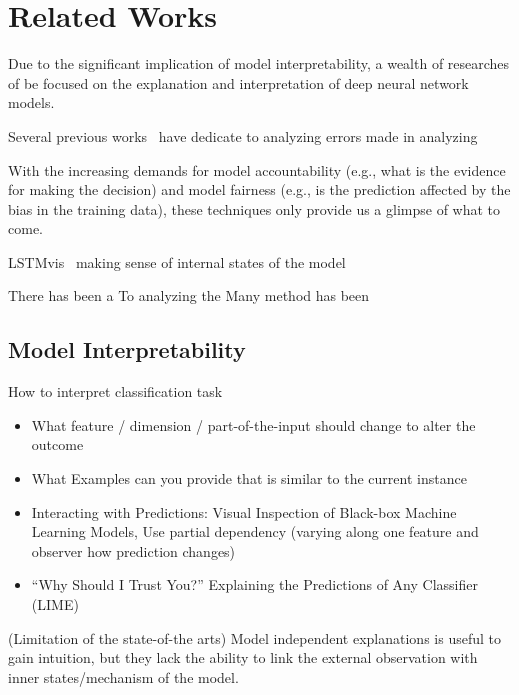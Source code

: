\section{Related Works}
Due to the significant implication of model interpretability, a wealth of researches of be focused on the explanation and interpretation of deep neural network models.

Several previous works~\cite{BilalJourablooYe2018} have dedicate to analyzing errors made in analyzing 

With the increasing demands for model accountability (e.g., what is the evidence for making the decision) and model fairness (e.g., is the prediction affected by the bias in the training data), these techniques only provide us a glimpse of what to come. 

LSTMvis~\cite{StrobeltGehrmannHuber2016} making sense of internal states of the model

There has been a
To analyzing the
Many method has been


\subsection{Model Interpretability}

How to interpret classification task
\begin{itemize}
    \item What feature / dimension / part-of-the-input should change to
    alter the outcome
    \item What Examples can you provide that is similar to the current
    instance
\end{itemize}
\begin{itemize}
    \item Interacting with Predictions: Visual Inspection of Black-box Machine Learning Models,
    Use partial dependency (varying along one feature and observer how prediction changes)
    \item “Why Should I Trust You?” Explaining the Predictions of Any Classifier (LIME)
\end{itemize}

(Limitation of the state-of-the arts)
Model independent explanations is useful to gain intuition, but they lack the ability to link the external observation with inner states/mechanism of the model.

